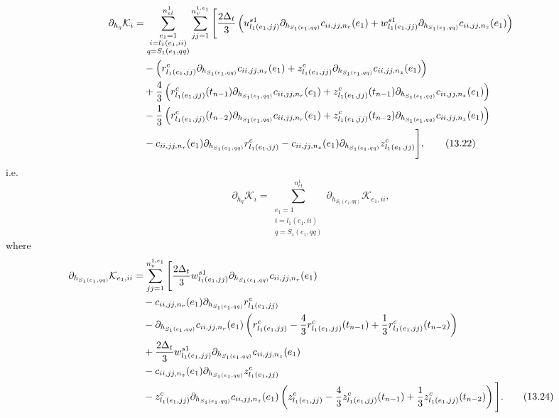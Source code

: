 \documentclass{article}
\begin{document}
\begin{align}
\partial_{h_q} \mathcal{K}_i &= \sum_{\substack{e_1=1\\ i=l_1(e_1,ii)\\ q=S_1(e_1,qq)}}^{n_{el}^1} \sum_{jj=1}^{n_v^{1,e_1}} \Bigg[ \frac{2\Delta_t}{3} \left( u_{l_1(e_1,jj)}^{s1} \partial_{h_{S_1(e_1,qq)}} c_{ii,jj,n_r}(e_1) + w_{l_1(e_1,jj)}^{s1} \partial_{h_{S_1(e_1,qq)}} c_{ii,jj,n_z}(e_1) \right) \nonumber\\
&\quad - \left( r_{l_1(e_1,jj)}^c \partial_{h_{S_1(e_1,qq)}} c_{ii,jj,n_r}(e_1) + z_{l_1(e_1,jj)}^c \partial_{h_{S_1(e_1,qq)}} c_{ii,jj,n_z}(e_1) \right) \nonumber\\
&\quad + \frac{4}{3} \left( r_{l_1(e_1,jj)}^c(t_{n-1}) \partial_{h_{S_1(e_1,qq)}} c_{ii,jj,n_r}(e_1) + z_{l_1(e_1,jj)}^c(t_{n-1}) \partial_{h_{S_1(e_1,qq)}} c_{ii,jj,n_z}(e_1) \right) \nonumber\\
&\quad - \frac{1}{3} \left( r_{l_1(e_1,jj)}^c(t_{n-2}) \partial_{h_{S_1(e_1,qq)}} c_{ii,jj,n_r}(e_1) + z_{l_1(e_1,jj)}^c(t_{n-2}) \partial_{h_{S_1(e_1,qq)}} c_{ii,jj,n_z}(e_1) \right) \nonumber\\
&\quad - c_{ii,jj,n_r}(e_1) \partial_{h_{S_1(e_1,qq)}} r_{l_1(e_1,jj)}^c - c_{ii,jj,n_z}(e_1) \partial_{h_{S_1(e_1,qq)}} z_{l_1(e_1,jj)}^c \Bigg], \tag{13.22}
\end{align}
i.e.
\begin{equation}
\partial_{h_q} \mathcal{K}_i = \sum_{\substack{e_1=1\\ i=l_1(e_1,ii)\\ q=S_1(e_1,qq)}}^{n_{el}^1} \partial_{h_{S_1(e_1,qq)}} \mathcal{K}_{e_1,ii}, \tag{13.23}
\end{equation}
where
\begin{align}
\partial_{h_{S_1(e_1,qq)}} \mathcal{K}_{e_1,ii} &= \sum_{jj=1}^{n_v^{1,e_1}} \Bigg[ \frac{2\Delta_t}{3} w_{l_1(e_1,jj)}^{s1} \partial_{h_{S_1(e_1,qq)}} c_{ii,jj,n_r}(e_1) \nonumber\\
&\quad - c_{ii,jj,n_r}(e_1) \partial_{h_{S_1(e_1,qq)}} r_{l_1(e_1,jj)}^c \nonumber\\
&\quad - \partial_{h_{S_1(e_1,qq)}} c_{ii,jj,n_r}(e_1) \left( r_{l_1(e_1,jj)}^c - \frac{4}{3} r_{l_1(e_1,jj)}^c(t_{n-1}) + \frac{1}{3} r_{l_1(e_1,jj)}^c(t_{n-2}) \right) \nonumber\\
&\quad + \frac{2\Delta_t}{3} w_{l_1(e_1,jj)}^{s1} \partial_{h_{S_1(e_1,qq)}} c_{ii,jj,n_z}(e_1) \nonumber\\
&\quad - c_{ii,jj,n_z}(e_1) \partial_{h_{S_1(e_1,qq)}} z_{l_1(e_1,jj)}^c \nonumber\\
&\quad - z_{l_1(e_1,jj)}^c \partial_{h_{S_1(e_1,qq)}} c_{ii,jj,n_z}(e_1) \left( z_{l_1(e_1,jj)}^c - \frac{4}{3} z_{l_1(e_1,jj)}^c(t_{n-1}) + \frac{1}{3} z_{l_1(e_1,jj)}^c(t_{n-2}) \right) \Bigg]. \tag{13.24}
\end{align}
\end{document}
